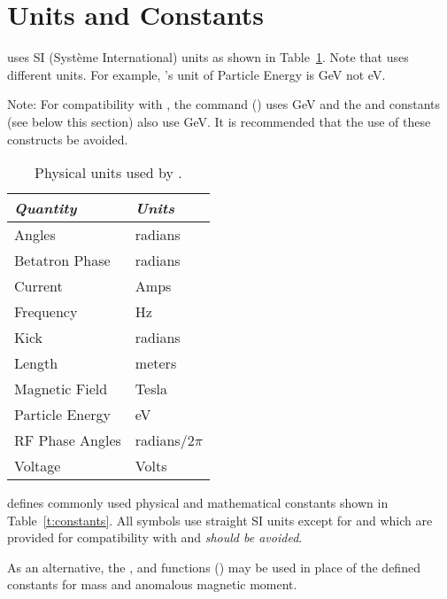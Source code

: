 {{{\section{Units and Constants}
\label{s:constants}

\bmad uses SI (Syst\`eme International) units as shown in Table~\ref{t:units}.  Note that \mad uses
different units. For example, \mad's unit of Particle Energy is GeV not eV. 

Note: For compatibility with \mad, the  command () uses GeV
and the  and  constants (see below this section) also use GeV. It is recommended that
the use of these constructs be avoided.

\begin{table}[ht]
\centering
\begin{tabular}{ll} \toprule
  {\em Quantity}     & {\em Units}       \\ \midrule
  Angles             &    radians        \\ 
  Betatron Phase     &    radians        \\
  Current            &    Amps           \\ 
  Frequency          &    Hz             \\ 
  Kick               &    radians        \\ 
  Length             &    meters         \\ 
  Magnetic Field     &    Tesla          \\ 
  Particle Energy    &    eV             \\ 
  RF Phase Angles    &    radians/2$\pi$ \\ 
  Voltage            &    Volts          \\ \bottomrule
\end{tabular}
\caption{Physical units used by \bmad.}
\label{t:units}
\end{table}

\bmad defines commonly used physical and mathematical constants shown in Table~\ref{t:constants}.
All symbols use straight SI units except for  and  which are provided for
compatibility with \mad and {\large\em should be avoided}.

As an alternative, the , and  functions
() may be used in place of the defined constants for mass and anomalous
magnetic moment.

}}}
